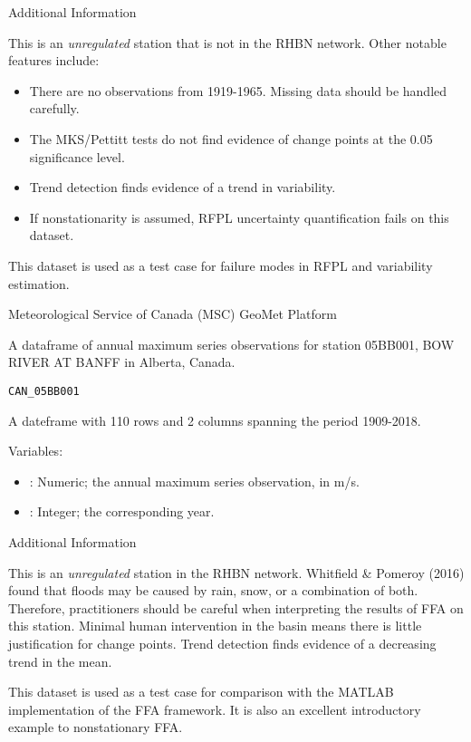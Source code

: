 \documentclass[a4paper]{book}
\begin{document}
%
\begin{Section}{Additional Information}

This is an \emph{unregulated} station that is not in the RHBN network. Other notable features include:
\begin{itemize}

\item{} There are no observations from 1919-1965. Missing data should be handled carefully.
\item{} The MKS/Pettitt tests do not find evidence of change points at the 0.05 significance level.
\item{} Trend detection finds evidence of a trend in variability.
\item{} If nonstationarity is assumed, RFPL uncertainty quantification fails on this dataset.

\end{itemize}


This dataset is used as a test case for failure modes in RFPL and variability estimation.
\end{Section}
%
\begin{Source}
Meteorological Service of Canada (MSC) GeoMet Platform
\end{Source}
%
\begin{Description}
A dataframe of annual maximum series observations for
station 05BB001, BOW RIVER AT BANFF in Alberta, Canada.
\end{Description}
%
\begin{Usage}
\begin{verbatim}
CAN_05BB001
\end{verbatim}
\end{Usage}
%
\begin{Format}
A dateframe with 110 rows and 2 columns spanning the period 1909-2018.
\end{Format}
%
\begin{Details}
Variables:
\begin{itemize}

\item{} : Numeric; the annual maximum series observation, in m/s.
\item{} : Integer; the corresponding year.

\end{itemize}

\end{Details}
%
\begin{Section}{Additional Information}

This is an \emph{unregulated} station in the RHBN network. Whitfield \& Pomeroy (2016) found that
floods may be caused by rain, snow, or a combination of both. Therefore, practitioners should
be careful when interpreting the results of FFA on this station. Minimal human intervention in
the basin means there is little justification for change points. Trend detection finds
evidence of a decreasing trend in the mean.

This dataset is used as a test case for comparison with the MATLAB implementation of the
FFA framework. It is also an excellent introductory example to nonstationary FFA.
\end{Section}
\end{document}

